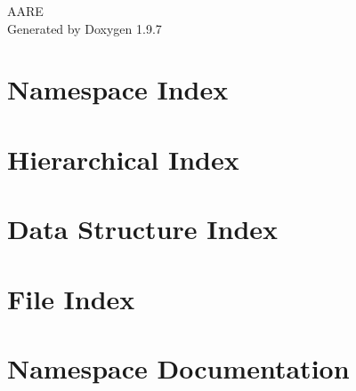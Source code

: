 \documentclass[twoside]{book}
\newcommand{\+}{\discretionary{\mbox{\scriptsize$\hookleftarrow$}}{}{}}
\newcommand{\clearemptydoublepage}{%
    \newpage{\pagestyle{empty}\cleardoublepage}%
  }
\begin{document}
  \raggedbottom
    \hypersetup{pageanchor=false,
                bookmarksnumbered=true,
                pdfencoding=unicode
               }
  \begin{titlepage}
  \vspace*{7cm}
  \begin{center}%
  {\Large AARE}\\
  \vspace*{1cm}
  {\large Generated by Doxygen 1.9.7}\\
  \end{center}
  \end{titlepage}
  \clearemptydoublepage
  \tableofcontents
  \clearemptydoublepage
  \hypersetup{pageanchor=true}

\chapter{Namespace Index}

\chapter{Hierarchical Index}

\chapter{Data Structure Index}

\chapter{File Index}

\chapter{Namespace Documentation}















\end{document}
